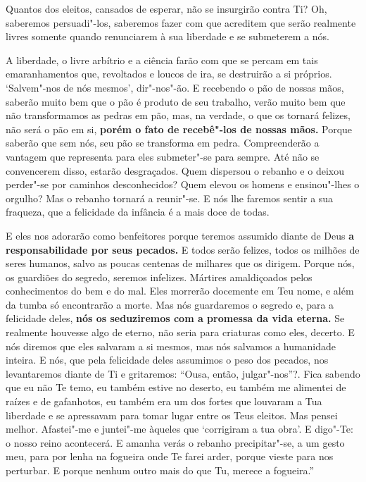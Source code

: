 Quantos dos eleitos, cansados de esperar, não se insurgirão contra Ti?
Oh, saberemos persuadi"-los, saberemos fazer com que acreditem que serão
realmente livres somente quando renunciarem à sua liberdade e se
submeterem a nós.

A liberdade, o livre arbítrio e a ciência farão com que se percam em
tais emaranhamentos que, revoltados e loucos de ira, se destruirão a si
próprios. `Salvem"-nos de nós mesmos', dir"-nos"-ão. E recebendo o pão de
nossas mãos, saberão muito bem que o pão é produto de seu trabalho,
verão muito bem que não transformamos as pedras em pão, mas, na verdade,
o que os tornará felizes, não será o pão em si, \textbf{porém o fato de
recebê"-los de nossas mãos.} Porque saberão que sem nós, seu pão se
transforma em pedra. Compreenderão a vantagem que representa para eles
submeter"-se para sempre. Até não se convencerem disso, estarão
desgraçados. Quem dispersou o rebanho e o deixou perder"-se por caminhos
desconhecidos? Quem elevou os homens e ensinou"-lhes o orgulho? Mas o
rebanho tornará a reunir"-se. E nós lhe faremos sentir a sua fraqueza,
que a felicidade da infância é a mais doce de todas.

E eles nos adorarão como benfeitores porque teremos assumido diante de
Deus \textbf{a responsabilidade por seus pecados.} E todos serão
felizes, todos os milhões de seres humanos, salvo as poucas centenas de
milhares que os dirigem. Porque nós, os guardiões do segredo, seremos
infelizes. Mártires amaldiçoados pelos conhecimentos do bem e do mal.
Eles morrerão docemente em Teu nome, e além da tumba só encontrarão a
morte. Mas nós guardaremos o segredo e, para a felicidade deles,
\textbf{nós os seduziremos com a promessa da vida eterna.} Se realmente
houvesse algo de eterno, não seria para criaturas como eles, decerto. E
nós diremos que eles salvaram a si mesmos, mas nós salvamos a humanidade
inteira. E nós, que pela felicidade deles assumimos o peso dos pecados,
nos levantaremos diante de Ti e gritaremos: ``Ousa, então,
julgar"-nos''?. Fica sabendo que eu não Te temo, eu também estive no
deserto, eu também me alimentei de raízes e de gafanhotos, eu também era
um dos fortes que louvaram a Tua liberdade e se apressavam para tomar
lugar entre os Teus eleitos. Mas pensei melhor. Afastei"-me e juntei"-me
àqueles que `corrigiram a tua obra'. E digo"-Te: o nosso reino
acontecerá. E amanha verás o rebanho precipitar"-se, a um gesto meu, para
por lenha na fogueira onde Te farei arder, porque vieste para nos
perturbar. E porque nenhum outro mais do que Tu, merece a fogueira.''

